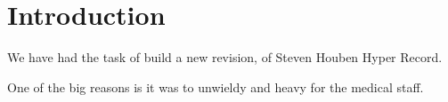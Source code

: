 \section{Introduction}


We have had the task of build a new revision, of Steven Houben Hyper Record.

One of the big reasons is it was to unwieldy and heavy for the medical staff.

